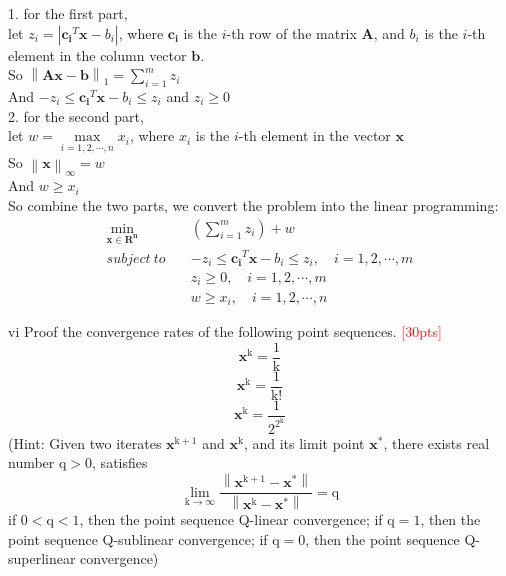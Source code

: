     1. for the first part,\\
    let $z_i = |\mathbf{c_i}^T\mathbf{x}-b_i|$, where $\mathbf{c_i}$ is the $i$-th row of the matrix $\mathbf{A}$, and $b_i$ is the $i$-th element in the column vector $\mathbf{b}$.\\
    So $\left\|\mathbf{Ax}-\mathbf{b}\right\|_1=\sum\limits_{i=1}^m z_i$\\
    And $-z_i \leq \mathbf{c_i}^T\mathbf{x}-b_i \leq z_i$ and $z_i \geq 0$\\

    2. for the second part,\\
    let $w = \max\limits_{i=1,2,\cdots,n}x_i$, where $x_i$ is the $i$-th element in the vector $\mathbf{x}$\\
    So $\left\|\mathbf{x}\right\|_\infty=w$\\
    And $w \geq x_i$\\
    
    So combine the two parts, we convert the problem into the linear programming:\\
    \begin{equation*}
        \begin{aligned}
            \min_{\mathbf{x}\in\mathbf{R^{n}}}\quad & (\sum\limits_{i=1}^m z_i) + w\\
            subject\ to \quad & -z_i \leq \mathbf{c_i}^T\mathbf{x}-b_i \leq z_i, \quad i=1,2,\cdots,m\\
            & z_i \geq 0, \quad i=1,2,\cdots,m\\
            & w \geq x_i, \quad i=1,2,\cdots,n
        \end{aligned}
    \end{equation*}


\newpage
\begin{problem}{vi}
Proof the convergence rates of the following point sequences.
\textcolor{red}{[30pts]}$$\mathbf{x^{\mathrm{k}}}=\frac{\mathrm{1}}{\mathrm{k}}$$$$\mathbf{x^{\mathrm{k}}}=\frac{\mathrm{1}}{\mathrm{k!}}$$$$\mathbf{x^{\mathrm{k}}}=\frac{\mathrm{1}}{\mathrm{2^{2^{k}}}}$$(Hint: Given two iterates $\mathbf{x^{\mathrm{k+1}}}$ and $\mathbf{x^{\mathrm{k}}}$, and its limit point $\mathbf{x^{\mathrm{*}}}$, there exists real number $\mathrm{q > 0}$, satisfies $$\lim_{\mathrm{k\rightarrow\infty}}\frac{\left\|\mathbf{x^{\mathrm{k+1}}}-\mathbf{x^{\mathrm{*}}}\right\|}{\left\|\mathbf{x^{\mathrm{k}}}-\mathbf{x^{\mathrm{*}}}\right\|} = \mathrm{q}$$ if $\mathrm{0<q<1}$, then the point sequence Q-linear convergence; if $\mathrm{q=1}$, then the point sequence Q-sublinear convergence; if $\mathrm{q=0}$, then the point sequence Q-superlinear convergence)
\end{problem}

